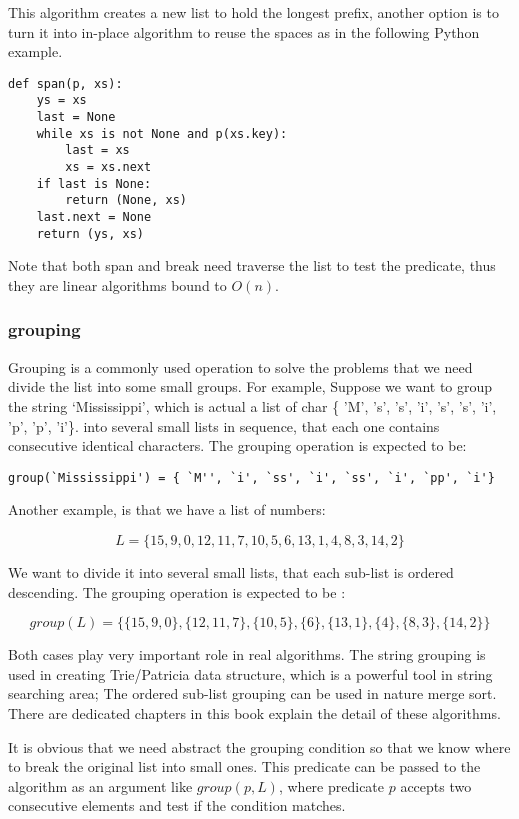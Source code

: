 \documentclass[UTF8]{article}
\begin{document}
This algorithm creates a new list to hold the longest prefix, another option is to turn it
into in-place algorithm to reuse the spaces as in the following Python example.

\lstset{language=Python}
\begin{lstlisting}
def span(p, xs):
    ys = xs
    last = None
    while xs is not None and p(xs.key):
        last = xs
        xs = xs.next
    if last is None:
        return (None, xs)
    last.next = None
    return (ys, xs)
\end{lstlisting}

Note that both span and break need traverse the list to test the predicate, thus they are linear
algorithms bound to $O(n)$.

\subsubsection{grouping}
Grouping is a commonly used operation to solve the problems that we need divide the list into some small groups.
For example, Suppose we want to group the
string `Mississippi', which is actual a list of char \{ 'M', 's', 's', 'i', 's', 's', 'i', 'p', 'p', 'i'\}.
into several small lists in sequence, that each one contains consecutive identical characters. The grouping
operation is expected to be:

\begin{verbatim}
group(`Mississippi') = { `M'', `i', `ss', `i', `ss', `i', `pp', `i'}
\end{verbatim}

Another example, is that we have a list of numbers:

\[
L = \{15, 9, 0, 12, 11, 7, 10, 5, 6, 13, 1, 4, 8, 3, 14, 2\}
\]

We want to divide it into several small lists, that each sub-list is ordered descending.
The grouping operation is expected to be :

\[
group(L) = \{ \{15, 9, 0\}, \{12, 11, 7\}, \{10, 5\}, \{6\}, \{13, 1\}, \{4\}, \{8, 3\}, \{14, 2\}\}
\]

Both cases play very important role in real algorithms. The string grouping is used in creating Trie/Patricia
data structure, which is a powerful tool in string searching area; The ordered sub-list grouping can be used in
nature merge sort. There are dedicated chapters in this book explain the detail of these algorithms.

It is obvious that we need abstract the grouping condition so that we know where to break the original list into
small ones. This predicate can be passed to the algorithm as an argument like $group(p, L)$, where predicate
$p$ accepts two consecutive elements and test if the condition matches.
\end{document}
